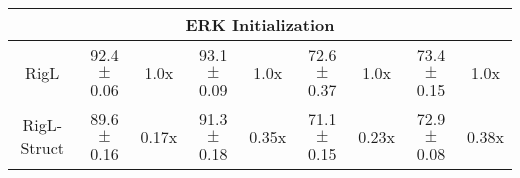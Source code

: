 \begin{table}[h]
{\begin{tabular}{ c cc cc cc cc}
    \midrule
    \multicolumn{9}{c}{ERK Initialization} \\
    \midrule
    
    {RigL} &
    {92.4 $\pm$ 0.06} & {1.0x} &
    {93.1 $\pm$ 0.09} & {1.0x} &
    {72.6 $\pm$ 0.37} & {1.0x} &
    {73.4 $\pm$ 0.15} & {1.0x} \\
    
    {RigL-Struct} &
    {89.6 $\pm$ 0.16} & {0.17x} &
    {91.3 $\pm$ 0.18} & {0.35x} &
    {71.1 $\pm$ 0.15} & {0.23x} &
    {72.9 $\pm$ 0.08} & {0.38x} \\
    \bottomrule
    
    \end{tabular}%
    }
    
    \label{tab:structured-sparsity}
\end{table}